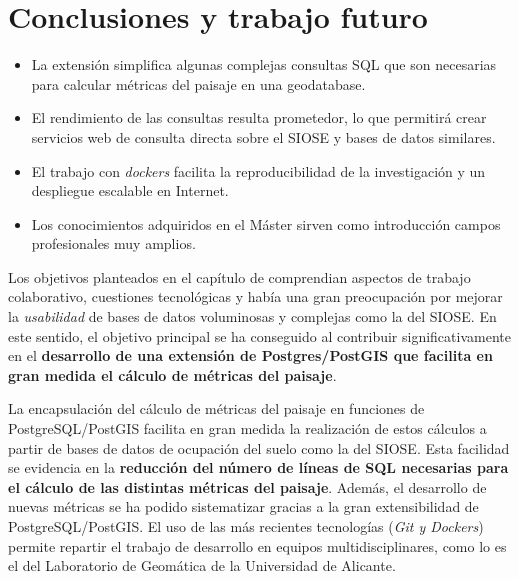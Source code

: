 \chapter{Conclusiones y trabajo futuro}\label{chap:concl}

\begin{graybox}
\begin{itemize}
\item La extensión \pgland{} simplifica algunas complejas consultas SQL que son necesarias para calcular métricas del paisaje en una geodatabase.
\item El rendimiento de las consultas resulta prometedor, lo que permitirá crear servicios web de consulta directa sobre el SIOSE y bases de datos similares.   
\item El trabajo con \textit{dockers} facilita la reproducibilidad de la investigación y un despliegue escalable en Internet.
\item Los conocimientos adquiridos en el Máster sirven como introducción campos profesionales muy amplios.
\end{itemize}
\end{graybox}

Los objetivos planteados en el capítulo de  comprendian aspectos de trabajo colaborativo, cuestiones tecnológicas y había una gran preocupación por mejorar la \textit{usabilidad} de bases de datos voluminosas y complejas como la del SIOSE. En este sentido, el objetivo principal se ha conseguido al contribuir significativamente en el \textbf{desarrollo de una extensión de Postgres/PostGIS que facilita en gran medida el cálculo de métricas del paisaje}. 

La encapsulación del cálculo de métricas del paisaje en funciones de PostgreSQL/PostGIS facilita en gran medida la realización de estos cálculos a partir de bases de datos de ocupación del suelo como la del SIOSE. Esta facilidad se evidencia en la \textbf{reducción del número de líneas de SQL necesarias para el cálculo de las distintas métricas del paisaje}. Además, el desarrollo de nuevas métricas se ha podido sistematizar gracias a la gran extensibilidad de PostgreSQL/PostGIS. El uso de las más recientes tecnologías (\textit{Git y Dockers}) permite repartir el trabajo de desarrollo en equipos multidisciplinares, como lo es el del Laboratorio de Geomática de la Universidad de Alicante.

